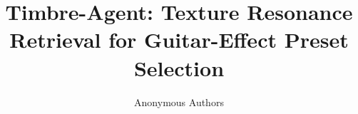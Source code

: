 \documentclass[journal,10pt]{IEEEtran}
\title{Timbre-Agent: Texture Resonance Retrieval for Guitar-Effect Preset Selection}
\author{Anonymous Authors}
\begin{document}
\newcommand{\paperbibliostyle}{IEEEtranN}

\end{document}
